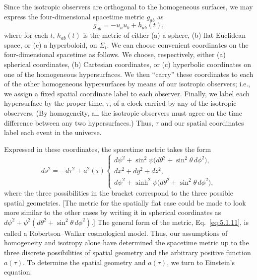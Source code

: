 Since the isotropic observers are orthogonal to the homogeneous surfaces, we may
express the four-dimensional spacetime metric \(g_{ab}\) as
\begin{equation}
  g_{ab}=-u_a u_b+h_{ab}(t),
  \tag{5.1.10}\label{eq:5.1.10}
\end{equation}
where for each \(t\), \(h_{ab}(t)\) is the metric of either (a) a sphere, (b) flat
Euclidean space, or (c) a hyperboloid, on \(\Sigma_t\). We can choose convenient
coordinates on the four-dimensional spacetime as follows. We choose, respectively,
either (a) spherical coordinates, (b) Cartesian coordinates, or (c) hyperbolic
coordinates on one of the homogeneous hypersurfaces. We then ``carry'' these
coordinates to each of the other homogeneous hypersurfaces by means of our
isotropic observers; i.e., we assign a fixed spatial coordinate label to each observer.
Finally, we label each hypersurface by the proper time, \(\tau\), of a clock carried by
any of the isotropic observers. (By homogeneity, all the isotropic observers must
agree on the time difference between any two hypersurfaces.) Thus, \(\tau\) and our
spatial coordinates label each event in the universe.

Expressed in these coordinates, the spacetime metric takes the form
\begin{equation}
  ds^2=-d\tau^2+a^2(\tau)
  \begin{cases}
    d\psi^2+\sin^2\psi\bigl(d\theta^2+\sin^2\theta\,d\phi^2\bigr),\\
    dx^2+dy^2+dz^2,\\
    d\psi^2+\sinh^2\psi\bigl(d\theta^2+\sin^2\theta\,d\phi^2\bigr),
  \end{cases}
  \tag{5.1.11}\label{eq:5.1.11}
\end{equation}
where the three possibilities in the bracket correspond to the three possible spatial
geometries. [The metric for the spatially flat case could be made to look more
similar to the other cases by writing it in spherical coordinates as
\(d\psi^2+\psi^2(d\theta^2+\sin^2\theta\,d\phi^2)\).] The general form of the
metric, Eq.~\eqref{eq:5.1.11}, is called a Robertson--Walker cosmological model.
Thus, our assumptions of homogeneity and isotropy alone have determined the
spacetime metric up to the three discrete possibilities of spatial geometry and the
arbitrary positive function \(a(\tau)\). To determine the spatial geometry and
\(a(\tau)\), we turn to Einstein's equation.
